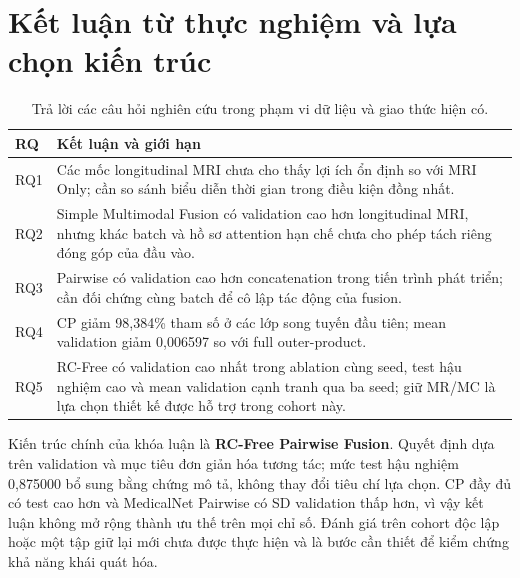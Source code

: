\FloatBarrier

\section{Kết luận từ thực nghiệm và lựa chọn kiến trúc}
\label{sec:rq-results}
\begin{table}[H]
\centering
\small
\caption[Kết luận cho các câu hỏi nghiên cứu]{Trả lời các câu hỏi nghiên cứu trong phạm vi dữ liệu và giao thức hiện có.}
\label{tab:rq-answer}
\begin{tabularx}{\linewidth}{@{}C{0.9cm}Y@{}}
\toprule
\textbf{RQ} & \textbf{Kết luận và giới hạn} \\
\midrule
RQ1 & Các mốc longitudinal MRI chưa cho thấy lợi ích ổn định so với MRI Only; cần so sánh biểu diễn thời gian trong điều kiện đồng nhất. \\
RQ2 & Simple Multimodal Fusion có validation cao hơn longitudinal MRI, nhưng khác batch và hồ sơ attention hạn chế chưa cho phép tách riêng đóng góp của đầu vào. \\
RQ3 & Pairwise có validation cao hơn concatenation trong tiến trình phát triển; cần đối chứng cùng batch để cô lập tác động của fusion. \\
RQ4 & CP giảm 98,384\% tham số ở các lớp song tuyến đầu tiên; mean validation giảm 0,006597 so với full outer-product. \\
RQ5 & RC-Free có validation cao nhất trong ablation cùng seed, test hậu nghiệm cao và mean validation cạnh tranh qua ba seed; giữ MR/MC là lựa chọn thiết kế được hỗ trợ trong cohort này. \\
\bottomrule
\end{tabularx}
\end{table}

Kiến trúc chính của khóa luận là \textbf{RC-Free Pairwise Fusion}. Quyết định dựa trên validation và mục tiêu đơn giản hóa tương tác; mức test hậu nghiệm 0,875000 bổ sung bằng chứng mô tả, không thay đổi tiêu chí lựa chọn. CP đầy đủ có test cao hơn và MedicalNet Pairwise có SD validation thấp hơn, vì vậy kết luận không mở rộng thành ưu thế trên mọi chỉ số. Đánh giá trên cohort độc lập hoặc một tập giữ lại mới chưa được thực hiện và là bước cần thiết để kiểm chứng khả năng khái quát hóa.
